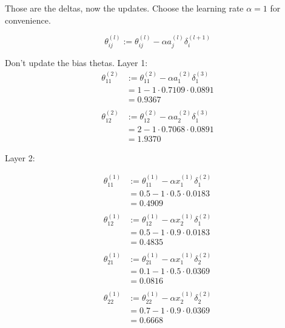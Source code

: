 \documentclass{article}
\begin{document}
Those are the deltas, now the updates. 
Choose the learning rate $\alpha = 1$ for convenience.

\begin{equation*}
\theta_{ij}^{(l)} := \theta_{ij}^{(l)} - \alpha a_j^{(l)} \delta_i^{(l+1)}
\end{equation*}

Don't update the bias thetas.
Layer 1: 
\begin{align*}
\theta_{11}^{(2)} &:= \theta_{11}^{(2)} - \alpha a_1^{(2)} \delta_1^{(3)} \\
&= 1 -  1 \cdot 0.7109 \cdot 0.0891 \\
&= 0.9367 \\
\\
\theta_{12}^{(2)} &:= \theta_{12}^{(2)} - \alpha a_2^{(2)} \delta_1^{(3)}  \\
&= 2 - 1 \cdot 0.7068 \cdot 0.0891 \\
&= 1.9370
\end{align*}

Layer 2:

\begin{align*}
\theta_{11}^{(1)} &:= \theta_{11}^{(1)} - \alpha x_1^{(1)} \delta_1^{(2)} \\
&= 0.5 - 1 \cdot 0.5 \cdot 0.0183\\
&= 0.4909\\
\\
\theta_{12}^{(1)} &:= \theta_{12}^{(1)} - \alpha x_2^{(1)} \delta_1^{(2)} \\
&= 0.5 - 1 \cdot 0.9 \cdot 0.0183\\
&= 0.4835 \\
\\
\theta_{21}^{(1)} &:= \theta_{21}^{(1)} - \alpha x_1^{(1)} \delta_2^{(2)} \\
&= 0.1 - 1 \cdot  0.5 \cdot 0.0369 \\
&= 0.0816 \\
\\
\theta_{22}^{(1)} &:= \theta_{22}^{(1)} - \alpha x_2^{(1)} \delta_2^{(2)} \\
&= 0.7 - 1 \cdot 0.9 \cdot 0.0369\\
&= 0.6668
\end{align*}
\end{document}
